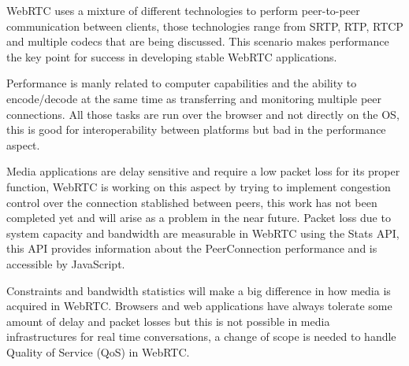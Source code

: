 WebRTC uses a mixture of different technologies to perform peer-to-peer communication between clients, those technologies range from SRTP, RTP, RTCP and multiple codecs that are being discussed. This scenario makes performance the key point for success in developing stable WebRTC applications. 

Performance is manly related to computer capabilities and the ability to encode/decode at the same time as transferring and monitoring multiple peer connections. All those tasks are run over the browser and not directly on the OS, this is good for interoperability between platforms but bad in the performance aspect. 

Media applications are delay sensitive and require a low packet loss for its proper function, WebRTC is working on this aspect by trying to implement congestion control over the connection stablished between peers, this work has not been completed yet and will arise as a problem in the near future. Packet loss due to system capacity and bandwidth are measurable in WebRTC using the Stats API, this API provides information about the PeerConnection performance and is accessible by JavaScript.

Constraints and bandwidth statistics will make a big difference in how media is acquired in WebRTC. Browsers and web applications have always tolerate some amount of delay and packet losses but this is not possible in media infrastructures for real time conversations, a change of scope is needed to handle Quality of Service (QoS) in WebRTC.

